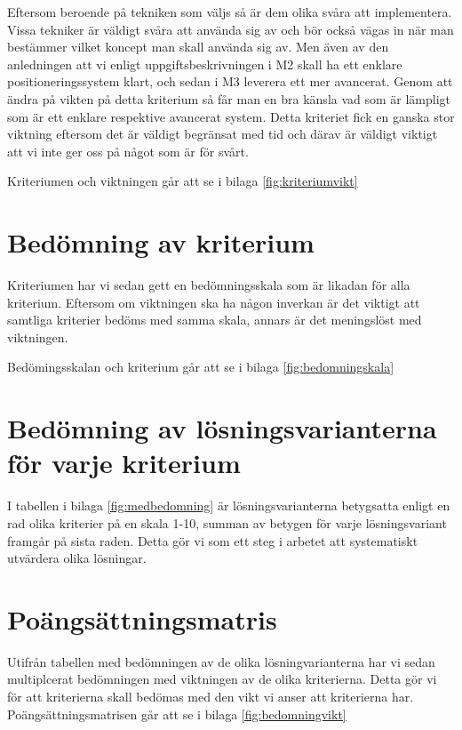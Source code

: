 \documentclass[11pt, a4paper]{report}
\begin{document}
Eftersom beroende på tekniken som väljs så är dem olika svåra att implementera. Vissa tekniker är väldigt svåra att använda sig av och bör också vägas in när man bestämmer vilket koncept man skall använda sig av. Men även av den anledningen att vi enligt uppgiftsbeskrivningen i M2 skall ha ett enklare positioneringssystem klart, och sedan i M3 leverera ett mer avancerat. Genom att ändra på vikten på detta kriterium så får man en bra känsla vad som är lämpligt som är ett enklare respektive avancerat system. Detta kriteriet fick en ganska stor viktning eftersom det är väldigt begränsat med tid och därav är väldigt viktigt att vi inte ger oss på något som är för svårt.

Kriteriumen och viktningen går att se i bilaga \ref{fig:kriteriumvikt}


\section{Bedömning av kriterium}

Kriteriumen har vi sedan gett en bedömningsskala som är likadan för alla kriterium. Eftersom om viktningen ska ha någon inverkan är det viktigt att samtliga kriterier bedöms med samma skala, annars är det meningslöst med viktningen.

Bedömingsskalan och kriterium går att se i bilaga \ref{fig:bedomningskala}

\section{Bedömning av lösningsvarianterna för varje kriterium}

I tabellen i bilaga \ref{fig:medbedomning} är lösningsvarianterna betygsatta enligt en rad olika kriterier på en skala 1-10, summan av betygen för varje lösningsvariant framgår på sista raden. Detta gör vi som ett steg i arbetet att systematiskt utvärdera olika lösningar.

\section{Poängsättningsmatris}

Utifrån tabellen med bedömningen av de olika lösningvarianterna har vi sedan multiplcerat bedömningen med viktningen av de olika kriterierna. Detta gör vi för att kriterierna skall bedömas med den vikt vi anser att kriterierna har. Poängsättningsmatrisen går att se i bilaga \ref{fig:bedomningvikt}
\end{document}
